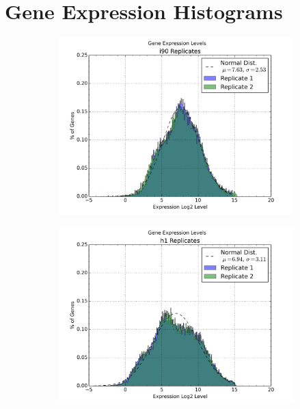 \section*{Gene Expression Histograms}

\begin{figure}
  \centering

  \begin{subfigure}[b]{0.45\textwidth}
    \centering
    \includegraphics[width=\textwidth]{./fig/supplementary/i90-expression-levels.png}\label{fig:190Expression}
  \end{subfigure}

  \hfill

  \begin{subfigure}[b]{0.45\textwidth}
    \includegraphics[width=\textwidth]{./fig/supplementary/h1-expression-levels.png}\label{fig:h1expression}
  \end{subfigure}


\end{figure}
